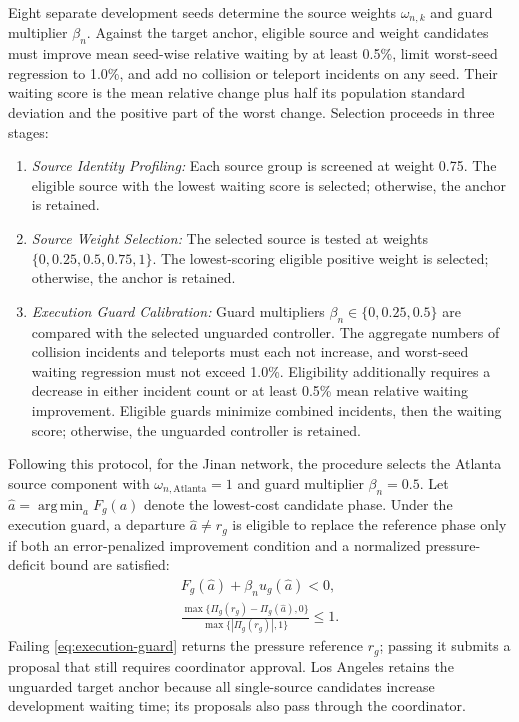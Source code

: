 \documentclass[letterpaper,journal]{IEEEtran}
\DeclareMathOperator*{\argmin}{arg\,min}
\begin{document}
Eight separate development seeds determine the source weights $\omega_{n,k}$ and guard multiplier $\beta_n$. Against the target anchor, eligible source and weight candidates must improve mean seed-wise relative waiting by at least 0.5\%, limit worst-seed regression to 1.0\%, and add no collision or teleport incidents on any seed. Their waiting score is the mean relative change plus half its population standard deviation and the positive part of the worst change. Selection proceeds in three stages:
\begin{enumerate}
    \item \textit{Source Identity Profiling:} Each source group is screened at weight 0.75. The eligible source with the lowest waiting score is selected; otherwise, the anchor is retained.
    \item \textit{Source Weight Selection:} The selected source is tested at weights $\{0,0.25,0.5,0.75,1\}$. The lowest-scoring eligible positive weight is selected; otherwise, the anchor is retained.
    \item \textit{Execution Guard Calibration:} Guard multipliers $\beta_n\in\{0,0.25,0.5\}$ are compared with the selected unguarded controller. The aggregate numbers of collision incidents and teleports must each not increase, and worst-seed waiting regression must not exceed 1.0\%. Eligibility additionally requires a decrease in either incident count or at least 0.5\% mean relative waiting improvement. Eligible guards minimize combined incidents, then the waiting score; otherwise, the unguarded controller is retained.
\end{enumerate}

Following this protocol, for the Jinan network, the procedure selects the Atlanta source component with $\omega_{n,\mathrm{Atlanta}}=1$ and guard multiplier $\beta_n=0.5$. Let $\widehat a=\argmin_aF_g(a)$ denote the lowest-cost candidate phase. Under the execution guard, a departure $\widehat a\ne r_g$ is eligible to replace the reference phase only if both an error-penalized improvement condition and a normalized pressure-deficit bound are satisfied:
\begin{equation}
 \begin{gathered}
 F_g(\widehat a)+\beta_nu_g(\widehat a)<0,\\
 \frac{\max\{\Pi_g(r_g)-\Pi_g(\widehat a),0\}}
 {\max\{|\Pi_g(r_g)|,1\}}\leq1.
 \end{gathered}
 \label{eq:execution-guard}
\end{equation}
Failing \eqref{eq:execution-guard} returns the pressure reference $r_g$; passing it submits a proposal that still requires coordinator approval. Los Angeles retains the unguarded target anchor because all single-source candidates increase development waiting time; its proposals also pass through the coordinator.
\end{document}
